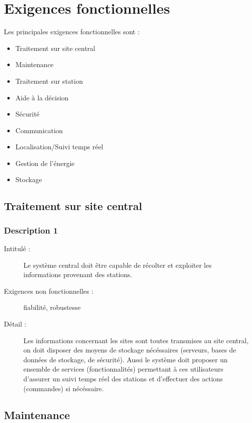 \section{Exigences fonctionnelles}

Les principales exigences fonctionnelles sont :
 \begin{itemize}
       \item Traitement sur site central
       \item Maintenance
       \item Traitement sur station
       \item Aide à la décision
       \item Sécurité
       \item Communication
       \item Localisation/Suivi temps réel
       \item Gestion de l'énergie
       \item Stockage
\end{itemize}


\subsection {Traitement sur site central }
\subsubsection {Description 1}
\begin{description}
           \item[Intitulé :] Le système central doit être capable de récolter et exploiter les informations provenant des stations.
           \item[Exigences non fonctionnelles :]  fiabilité, robustesse
           \item[Détail :]  Les informations concernant les sites sont toutes transmises au site central, on doit disposer des moyens
de stockage nécéssaires (serveurs, bases de données de stockage, de sécurité). Aussi le système doit proposer un
ensemble de services (fonctionnalités) permettant à ces utilisateurs d'assurer un suivi temps réel des stations et
d'effectuer des actions (commandes) si nécéssaire.
\end{description}


 \subsection {Maintenance}
